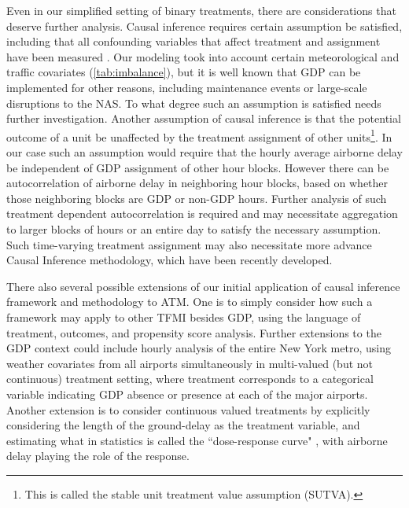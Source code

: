 \documentclass[conference]{IEEEtran}
\begin{document}
Even in our simplified setting of binary treatments, there are considerations that deserve further analysis.  Causal inference requires certain assumption be satisfied, including that all confounding variables that affect treatment and assignment have been measured \cite{austin2011introduction}.  Our modeling took into account certain meteorological and traffic covariates (\ref{tab:imbalance}), but it is well known that GDP can be implemented for other reasons, including maintenance events or large-scale disruptions to the NAS.  To what degree such an assumption is satisfied needs further investigation.  Another assumption of causal inference is that the potential outcome of a unit be unaffected by the treatment assignment of other units\footnote{This is called the stable unit treatment value assumption (SUTVA).}.  In our case such an assumption would require that the hourly average airborne delay be independent of GDP assignment of other hour blocks.  However there can be autocorrelation of airborne delay in neighboring hour blocks, based on whether those neighboring blocks are GDP or non-GDP hours.  Further analysis of such treatment dependent autocorrelation is required and may necessitate aggregation to larger blocks of hours or an entire day to satisfy the necessary assumption.  Such time-varying treatment assignment may also necessitate more advance Causal Inference methodology, which have been recently developed\cite{imai2015robust}. 

There also several possible extensions of our initial application of causal inference framework and methodology to ATM.  One is to simply consider how such a framework may apply to other TFMI besides GDP, using the language of treatment, outcomes, and propensity score analysis. Further extensions to the GDP context could include hourly analysis of the entire New York metro, using weather covariates from all airports simultaneously in multi-valued (but not continuous) treatment setting, where treatment corresponds to a categorical variable indicating GDP absence or presence at each of the major airports.  Another extension is to consider continuous valued treatments by explicitly considering the length of the ground-delay as the treatment variable, and estimating what in statistics is called the ``dose-response curve" \cite{kreif2015evaluation}, with airborne delay playing the role of the response.    
\end{document}
